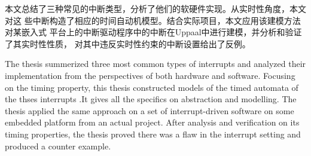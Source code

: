 
\makeatletter
\ifthu@bachelor\relax\else
  \ifthu@doctor
  \else
    \ifthu@master
    \fi
  \fi
\fi
\makeatother





\begin{cabstract}
   本文总结了三种常见的中断类型，分析了他们的软硬件实现。从实时性角度，本文对这
   些中断构造了相应的时间自动机模型。结合实际项目，本文应用该建模方法对某嵌入式
   平台上的中断驱动程序中的中断在Uppaal中进行建模，并分析和验证了其实时性性质，
   对其中违反实时性约束的中断设置给出了反例。
\end{cabstract}


\begin{eabstract} 
   The thesis summerized three most common types of interrupts and analyzed
   their implementation from the perspectives of both hardware and software.
   Focusing on the timing property, this thesis constructed models of the 
   timed automata of the thses interrupts .It gives all the specifics on 
   abstraction and modelling. The thesis applied the same approach on a set 
   of interrupt-driven software on some embedded platform from an actual 
   project. After analysis and verification on its timing properties, the 
   thesis proved there was a flaw in the interrupt setting and produced a 
   counter example.
\end{eabstract}


